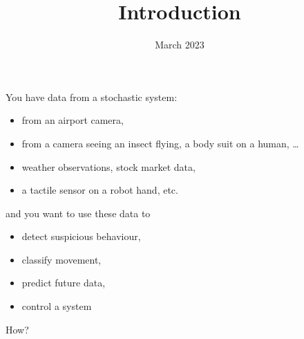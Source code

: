 \documentclass[USenglish,pdftex,compress,10pt,svgnamesi]{beamer}%
\title{Introduction}
\date{March 2023}
\begin{document}
\begin{frame}
	\titlepage
\end{frame}


\begin{frame}
You have data from a stochastic system:
\begin{itemize}
  \item from an airport camera,
  \item from a camera seeing an insect flying, a body suit on a human, \dots
  \item weather observations, stock market data,
  \item a tactile sensor on a robot hand, etc.
\end{itemize}
and you want to use these data to
\begin{itemize}
  \item detect suspicious behaviour,
  \item classify movement,
  \item predict future data,
  \item control a system
\end{itemize}
How?

%
%
\end{frame}
\end{document}
